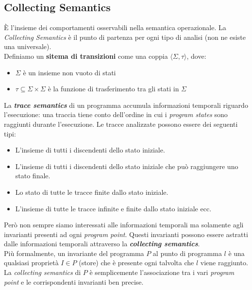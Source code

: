 \documentclass{article}
\begin{document}
        \subsection{Collecting Semantics}
            \MakeUppercase{è} l'insieme dei comportamenti osservabili nella semantica operazionale. La \textit{Collecting Semantics} è il punto di partenza per ogni tipo di analisi (non ne esiste una universale).\\
            Definiamo un \textbf{sitema di transizioni} come una coppia $ \langle \Sigma, \tau \rangle $, dove:
            \begin{itemize}
                \item $ \Sigma $ è un insieme non vuoto di stati
                \item $ \tau \subseteq \Sigma \times \Sigma $ è la funzione di trasferimento tra gli stati in $ \Sigma $
            \end{itemize}
            La \textbf{\textit{trace semantics}} di un programma accumula informazioni temporali riguardo l'esecuzione: una traccia tiene conto dell'ordine in cui i \textit{program states} sono raggiunti durante l'esecuzione.
            \noindent
            Le tracce analizzate possono essere dei seguenti tipi:
            \begin{itemize}
                \item L'insieme di tutti i discendenti dello stato iniziale.
                \item L'insieme di tutti i discendenti dello stato iniziale che può raggiungere uno stato finale.
                \item Lo stato di tutte le tracce finite dallo stato iniziale.
                \item L'insieme di tutte le tracce infinite e finite dallo stato iniziale ecc.
            \end{itemize}
            Però non sempre siamo interessati alle informazioni temporali ma solamente agli invarianti presenti ad ogni \textit{program point}. Questi invarianti possono essere astratti dalle informazioni temporali attraverso la \textbf{\textit{collecting semantics}}.\\
            Più formalmente, un invariante del programma $P$ al punto di programma $l$ è una qualsiasi proprietà $I\in P$ (store) che è presente ogni talvolta che $l$ viene raggiunto.\\
            La \textit{collecting semantics} di $P$ è semplicemente l'associazione tra i vari \textit{program point} e le corrispondenti invarianti ben precise.\\
\end{document}
